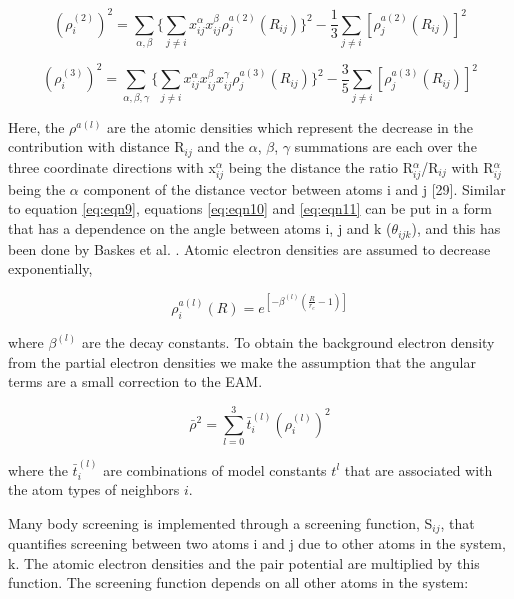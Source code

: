 \documentclass[review]{elsarticle}
\begin{document}
\begin{equation}
\label{eq:eqn10}
(\rho_{i}^{(2)})^{2}=\sum_{\alpha,\beta}\{\sum_{j \neq i}x_{ij}^{\alpha}x_{ij}^{\beta}\rho_{j}^{a(2)}(R_{ij})\}^{2} - \frac{1}{3}\sum_{j \neq i}[\rho_{j}^{a(2)}(R_{ij})]^2
\end{equation}

\begin{equation}
\label{eq:eqn11}
(\rho_{i}^{(3)})^{2}=\sum_{\alpha,\beta,\gamma}\{ \sum_{j \neq i}x_{ij}^{\alpha}x_{ij}^{\beta}x_{ij}^{\gamma}\rho_{j}^{a(3)}(R_{ij}) \}^{2} - \frac{3}{5}\sum_{j \neq i}[\rho_{j}^{a(3)}(R_{ij})]^2
\end{equation}

Here, the $\rho^{a(l)}$  are the atomic densities which represent the decrease in the contribution with distance R$_{ij}$ and the $\alpha$, $\beta$, $\gamma$ summations are each over the three coordinate directions with x$_{ij}^{\alpha}$ being the distance the ratio R$_{ij}^{\alpha}$/R$_{ij}$ with R$_{ij}^{\alpha}$ being the $\alpha$ component of the distance vector between atoms i and j [29].  Similar to equation \ref{eq:eqn9}, equations \ref{eq:eqn10} and \ref{eq:eqn11} can be put in a form that has a dependence on the angle between atoms i, j and k ($\theta_{ijk}$), and this has been done by Baskes et al. \cite{baskes1989}.  Atomic electron densities are assumed to decrease exponentially, 

\begin{equation}
\label{eq:eqn12}
\rho_{i}^{a(l)}(R) = e^{[-\beta^{(l)}(\frac{R}{r_{e}}-1)]}
\end{equation}

where $\beta^{(l)}$ are the decay constants.  To obtain the background electron density from the partial electron densities we make the assumption that the angular terms are a small correction to the EAM.

\begin{equation}
\label{eq:eqn13}
\bar{\rho}^{2} = \sum_{l=0}^{3}\bar{t}_{i}^{(l)} (\rho_{i}^{(l)})^{2}
\end{equation}

where the $\bar{t}_{i}^{(l)}$ \cite{valone2006} are combinations of model constants $t^{l}$ that are associated with the atom types of neighbors $i$.

Many body screening is implemented through a screening function, S$_{ij}$, that quantifies screening between two atoms i and j due to other atoms in the system, k.  The atomic electron densities and the pair potential are multiplied by this function.  The screening function depends on all other atoms in the system:
\end{document}

